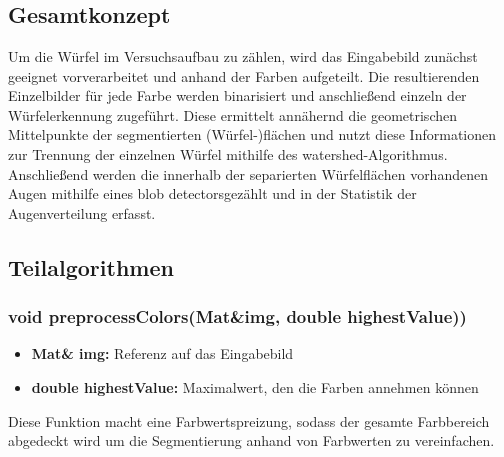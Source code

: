\documentclass{../Vorlage/sebDenCls}
\begin{document}


\section{}
\subsection{Gesamtkonzept}
Um die Würfel im Versuchsaufbau zu zählen, wird das Eingabebild zunächst geeignet vorverarbeitet und anhand der Farben aufgeteilt. Die resultierenden Einzelbilder für jede Farbe werden binarisiert und anschließend einzeln der Würfelerkennung zugeführt. Diese ermittelt annähernd die geometrischen Mittelpunkte der segmentierten (Würfel-)flächen und nutzt diese Informationen zur Trennung der einzelnen Würfel mithilfe des \glqq watershed\grqq-Algorithmus. Anschließend werden die innerhalb der separierten Würfelflächen vorhandenen Augen mithilfe eines \glqq blob detectors\grqq  gezählt und in der Statistik der Augenverteilung erfasst.

\subsection{Teilalgorithmen}

\subsubsection{void preprocessColors(Mat\&img, double highestValue))}
\begin{itemize}
	\item \textbf{Mat\& img:} Referenz auf das Eingabebild
	\item \textbf{double highestValue:} Maximalwert, den die Farben annehmen können
\end{itemize}
Diese Funktion macht eine Farbwertspreizung, sodass der gesamte Farbbereich abgedeckt wird um die Segmentierung anhand von Farbwerten zu vereinfachen.
\end{document}
